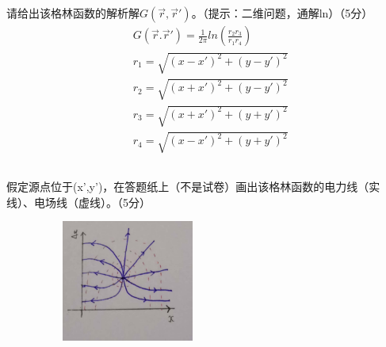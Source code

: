 \documentclass[UTF8]{ctexart}
\begin{document}
\subsection{}
请给出该格林函数的解析解$G(\vec r,\vec r')$。（提示：二维问题，通解ln）（5分）
\begin{equation*}
\begin{aligned}
&G(\vec r.\vec r')=\frac{1}{2\pi}ln(\frac{r_2r_3}{r_1r_4})\\
&r_1=\sqrt{(x-x')^2+(y-y')^2}\\
&r_2=\sqrt{(x+x')^2+(y-y')^2}\\
&r_3=\sqrt{(x+x')^2+(y+y')^2}\\
&r_4=\sqrt{(x-x')^2+(y+y')^2}
\end{aligned}
\end{equation*}
\subsection{}
假定源点位于(x',y')，在答题纸上（不是试卷）画出该格林函数的电力线（实线）、电场线（虚线）。（5分）
\begin{figure}[H]
\centering
\includegraphics[width=6cm,height=4cm]{2016-6.jpg}
\end{figure}
\end{document}
